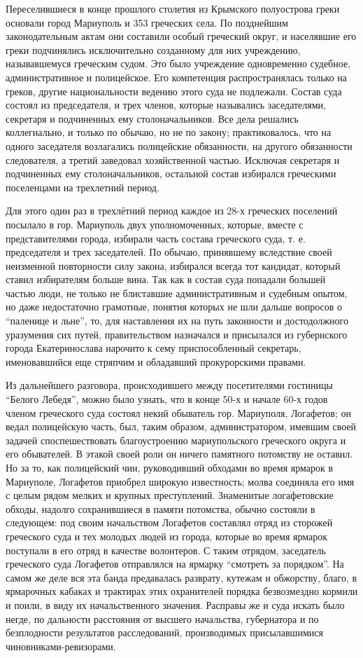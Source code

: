 \documentclass[a4paper,20pt]{article}
\begin{document}
Переселившиеся в конце прошлого столетия из Крымского полуострова греки
основали город Мариуполь и 353 греческих села.  По позднейшим законодательным
актам они составили особый греческий округ, и населявшие его греки подчинялись
исключительно созданному для них учреждению, называвшемуся греческим судом. Это
было учреждение одновременно судебное, административное и полицейское.  Его
компетенция распространялась только на греков, другие национальности ведению
этого суда не подлежали. Состав суда состоял из председателя, и трех членов,
которые назывались заседателями, секретаря и подчиненных ему столоначальников.
Все дела решались коллегиально, и только по обычаю, но не по закону;
практиковалось, что на одного заседателя возлагались полицейские обязанности,
на другого обязанности следователя, а третий заведовал хозяйственной частью.
Исключая секретаря и подчиненных ему столоначальников, остальной состав
избирался греческими поселенцами на трехлетний период.

Для этого один раз в трехлётний период каждое
из 28-х греческих поселений посылало в гор. Мариуполь
двух уполномоченных, которые, вместе с представителями города, избирали часть состава
греческого суда, т. е. председателя и трех заседателей. По обычаю, принявшему вследствие своей неизменной
повторности силу закона, избирался всегда тот кандидат, который ставил избирателям больше вина.
Так как в состав суда попадали большей частью люди, не только не блиставшие административным и судебным опытом,
но даже недостаточно грамотные, понятия которых не шли дальше вопросов о ``паленице и льне'', то,
для наставления их на путь законности и достодолжного уразумения сих путей, правительством назначался
и присылался из губернского города Екатеринослава нарочито к сему приспособленный секретарь, именовавшийся
еще стряпчим и обладавший прокурорскими правами.

Из дальнейшего разговора, происходившего между посетителями гостиницы ``Белого
Лебедя'', можно было узнать, что в конце 50-х и начале 60-х годов членом
греческого суда состоял некий обыватель гор. Мариуполя, Логафетов; он ведал
полицейскую часть, был, таким образом, администратором, имевшим своей задачей
споспешествовать благоустроению мариупольского греческого округа и его
обывателей. В этакой своей роли он ничего памятного потомству не оставил. Но за
то, как полицейский чин, руководивший обходами во время ярмарок в Мариуполе,
Логафетов приобрел широкую известность; молва соединяла его имя с целым рядом
мелких и крупных преступлений. Знаменитые логафетовские обходы, надолго
сохранившиеся в памяти потомства, обычно состояли в следующем: под своим
начальством Логафетов составлял отряд из сторожей греческого суда и тех молодых
людей из города, которые во время ярмарок поступали в его отряд в качестве
волонтеров. С таким отрядом, заседатель греческого суда Логафетов отправлялся
на ярмарку ``смотреть за порядком''. На самом же деле вся эта банда предавалась
разврату, кутежам и обжорству, благо, в ярмарочных кабаках и трактирах этих
охранителей порядка безвозмездно кормили и поили, в виду
их начальственного значения. Расправы же и суда искать
было негде, по дальности расстояния от высшего начальства, губернатора и по безплодности
результатов расследований, производимых присылавшимися чиновниками-ревизорами.
\end{document}
